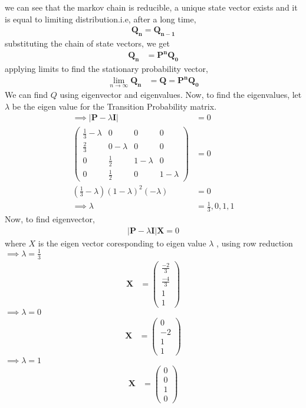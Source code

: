 \documentclass[journal,12pt,two column]{IEEEtran}
\providecommand{\brak}[1]{\ensuremath{\left(#1\right)}}
\newcommand{\myvec}[1]{\ensuremath{\begin{pmatrix}#1\end{pmatrix}}}
\let\vec\mathbf
\begin{document}
we can see that the markov chain is reducible, a unique state vector exists and it is equal to limiting distribution.i.e, after a long time,
\begin{align}
	\vec{Q_n}=\vec{Q_{n-1}}
\end{align}
substituting the chain of state vectors, we get
\begin{align}
    \vec{Q_{n}}&=\vec{P^n Q_0}
\end{align}
applying limits to find the stationary probability vector,
\begin{align}
     \lim_{n \to \infty} \vec{Q_{n}}&=\vec{Q}=\vec{P^n Q_0}
\end{align} \label{eq:steady}
We can find $Q$ using eigenvector and eigenvalues.
Now, to find the eigenvalues, let $\lambda$ be the eigen value for the Transition Probability matrix.
\begin{align}
	\implies |\vec{P} -\lambda \vec{I}|&=0\\
	\myvec{\frac{1}{3} -\lambda&0&0&0\\
                    \frac{2}{3}&0 - \lambda&0&0\\
                    0&\frac{1}{2}&1- \lambda&0\\
                    0&\frac{1}{2}&0&1-\lambda
                }&=0\\
                \brak{\frac{1}{3}-\lambda}\brak{1-\lambda}^2 \brak{-\lambda}&=0\\
                \implies \lambda&=\frac{1}{3},0,1,1
\end{align} 
Now, to find eigenvector,
\begin{align}
	|\vec{P}-\lambda \vec{I}|\vec{X}=0
\end{align}
where $X$ is the eigen vector coresponding to eigen value $\lambda$ , using row reduction\\
$\implies \lambda =\frac{1}{3}$
\begin{align}
	\vec{X}&=\myvec{\frac{-2}{3}\\\frac{-4}{3}\\1\\1}
\end{align}
$\implies \lambda =0$
\begin{align}
	\vec{X}&=\myvec{0\\-2\\1\\1}
\end{align}
$\implies \lambda = 1$
\begin{align}
	\vec{X}&=\myvec{0\\0\\1\\0}
\end{align}
\end{document}
